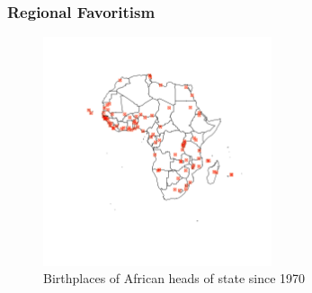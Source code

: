 \documentclass[]{beamer}   	%
\begin{document}
\begin{frame}
\frametitle{Regional Favoritism}
\begin{figure}
\centering
\includegraphics[width=0.6\textwidth,trim={15cm 16cm 10cm 8cm},clip]{../../Analysis/output/other_maps/birthplaces.png}
\caption{Birthplaces of African heads of state since 1970}
\label{fig:birthplaces}
\end{figure}
\end{frame}
\end{document}
